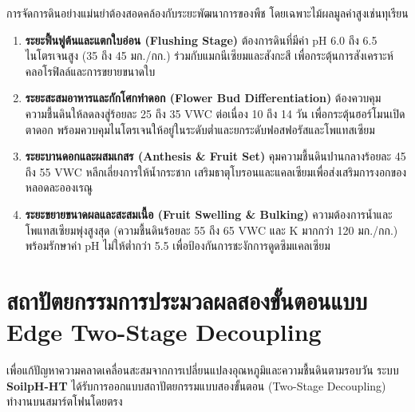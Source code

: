 การจัดการดินอย่างแม่นยำต้องสอดคล้องกับระยะพัฒนาการของพืช โดยเฉพาะไม้ผลมูลค่าสูงเช่นทุเรียน
\begin{enumerate}
    \item \textbf{ระยะฟื้นฟูต้นและแตกใบอ่อน (Flushing Stage)} ต้องการดินที่มีค่า pH 6.0 ถึง 6.5 ไนโตรเจนสูง (35 ถึง 45 มก./กก.) ร่วมกับแมกนีเซียมและสังกะสี เพื่อกระตุ้นการสังเคราะห์คลอโรฟิลล์และการขยายขนาดใบ
    \item \textbf{ระยะสะสมอาหารและกักโศกทำดอก (Flower Bud Differentiation)} ต้องควบคุมความชื้นดินให้ลดลงสู่ร้อยละ 25 ถึง 35 VWC ต่อเนื่อง 10 ถึง 14 วัน เพื่อกระตุ้นฮอร์โมนเปิดตาดอก พร้อมควบคุมไนโตรเจนให้อยู่ในระดับต่ำและยกระดับฟอสฟอรัสและโพแทสเซียม
    \item \textbf{ระยะบานดอกและผสมเกสร (Anthesis \& Fruit Set)} คุมความชื้นดินปานกลางร้อยละ 45 ถึง 55 VWC หลีกเลี่ยงการให้น้ำกระชาก เสริมธาตุโบรอนและแคลเซียมเพื่อส่งเสริมการงอกของหลอดละอองเรณู
    \item \textbf{ระยะขยายขนาดผลและสะสมเนื้อ (Fruit Swelling \& Bulking)} ความต้องการน้ำและโพแทสเซียมพุ่งสูงสุด (ความชื้นดินร้อยละ 55 ถึง 65 VWC และ K มากกว่า 120 มก./กก.) พร้อมรักษาค่า pH ไม่ให้ต่ำกว่า 5.5 เพื่อป้องกันการชะงักการดูดซึมแคลเซียม
\end{enumerate}

\section{สถาปัตยกรรมการประมวลผลสองขั้นตอนแบบ Edge Two-Stage Decoupling}

เพื่อแก้ปัญหาความคลาดเคลื่อนสะสมจากการเปลี่ยนแปลงอุณหภูมิและความชื้นดินตามรอบวัน ระบบ \textbf{SoilpH-HT} ได้รับการออกแบบสถาปัตยกรรมแบบสองขั้นตอน (Two-Stage Decoupling) ทำงานบนสมาร์ตโฟนโดยตรง

